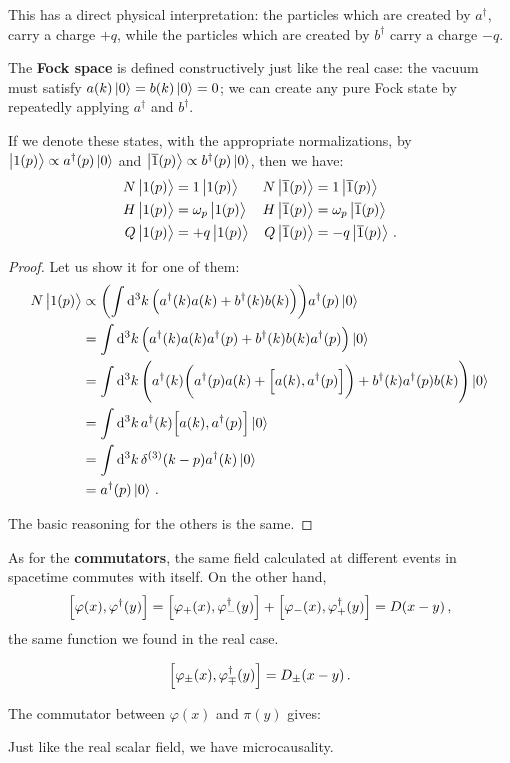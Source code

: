 \documentclass[main.tex]{subfiles}
\begin{document}
This has a direct physical interpretation: the particles which are created by \(a ^\dag\), carry a charge \(+q\), while the particles which are created by \(b ^\dag\) carry a charge \(-q\). 

The \textbf{Fock space} is defined constructively just like the real case: the vacuum must satisfy \(a (k) \ket{0} = b(k) \ket{0} = 0\); we can create any pure Fock state by repeatedly applying \(a ^\dag\) and \(b ^\dag\). 


\begin{claim}
If we denote these states, with the appropriate normalizations, by \(\ket{1(p)} \propto a ^\dag (p) \ket{0}\) and \(\ket{\overline{1} (p)} \propto b ^\dag(p) \ket{0}\), then we have: 
%
\begin{align} \label{eq:fock-one-particle-state-properties}
N \ket{1 (p)} &= 1 \ket{1 (p)} &
N \ket{\overline{1} (p)} &= 1 \ket{\overline{1} (p)}  \\
H \ket{1 (p)} &= \omega_{p} \ket{1 (p)} &
H \ket{\overline{1} (p)} &= \omega_{p} \ket{\overline{1} (p)}  \\
Q \ket{1 (p)} &= +q \ket{1 (p)} &
Q \ket{\overline{1} (p)} &= -q \ket{\overline{1} (p)}  
\,.
\end{align}
\end{claim}

\begin{proof}
Let us show it for one of them: 
%
\begin{align}
N \ket{1 (p)} &\propto
\qty(\int \dd[3]{k} \qty(a ^\dag(k) a(k) + b ^\dag(k) b (k))) 
a ^\dag (p) \ket{0}  \\
&= \int \dd[3]{k} \qty( a ^\dag (k) a (k) a ^\dag(p) + b ^\dag(k) b(k) a ^\dag (p)) \ket{0}  \\
&= \int \dd[3]{k} \qty( a ^\dag (k) \qty( a ^\dag(p) a (k) + \qty[a(k), a ^\dag(p)]) + b ^\dag(k) a ^\dag (p) b(k)) \ket{0}  \\
&= \int \dd[3]{k} a ^\dag (k) \qty[a(k), a ^\dag(p) ]  \ket{0}   \\
&= \int \dd[3]{k} \delta^{(3)} (k-p) a ^\dag(k) \ket{0} \\
&= a ^\dag(p) \ket{0}
\,.
\end{align}

The basic reasoning for the others is the same. 
\end{proof}

As for the \textbf{commutators}, the same field calculated at different events in spacetime commutes with itself. On the other hand, 
%
\begin{align}
\qty[ \varphi (x), \varphi ^\dag(y)]
= \qty[\varphi_{+} (x), \varphi ^\dag_{-} (y)]
+ \qty[\varphi_{-} (x), \varphi ^\dag_{+} (y)]
= D(x-y)
\,,
\end{align}
%
the same function we found in the real case. 

\begin{claim}
\begin{align}
\qty[\varphi_{\pm} (x), \varphi ^\dag_{\mp}(y)] = D_{\pm} (x-y)
\,.
\end{align}
\end{claim}

\begin{claim}
The commutator between \(\varphi (x)\) and \(\pi (y)\) gives: 
\end{claim}

Just like the real scalar field, we have microcausality. 
\end{document}
